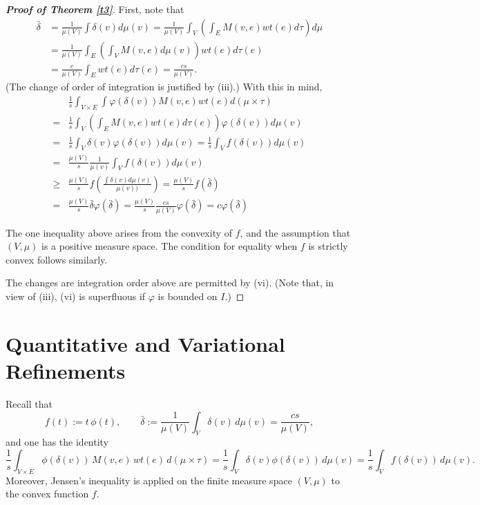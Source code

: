 \documentclass[final,1p,times]{elsarticle}
\begin{document}
\begin{proof}[\textbf{Proof of Theorem \ref{t3}}]
    
First, note that 
\begin{eqnarray*}
\bar {\delta} & = \frac {1}{\mu (V)} \int \delta (v) d \mu (v) = \frac {1}{\mu (V)} \int _V (\int _E M(v, e) wt(e) d \tau) d \mu\\
& = \frac {1}{\mu (V)} \int _E (\int _V M(v, e) d \mu(v)) wt(e) d \tau (e)\\
& = \frac {c}{\mu (V)} \int _E wt (e) d \tau (e) = \frac {cs}{\mu (V)}.
\end{eqnarray*}
(The change of order of integration is justified by (iii).)
With this in mind,
\begin{eqnarray*}
& \frac {1}{s} \int_{V \times E} \int \varphi (\delta (v)) M(v, e) wt(e) d(\mu \times \tau)\\
= & \frac {1}{s} \int _V (\int _E M(v, e) wt(e) d \tau (e)) \varphi (\delta (v)) d \mu (v)\\
= & \frac {1}{s} \int _V \delta (v) \varphi (\delta (v)) d \mu (v) = \frac {1}{s} \int _V f(\delta (v)) d \mu (v)\\
= & \frac {\mu (V)}{s} \frac {1}{\mu (v)} \int _V f(\delta (v)) d \mu (v)\\
\geq & \frac {\mu (V)}{s} f(\frac {\int \delta (v) d \mu (v)}{\mu (v))}) = \frac {\mu (V)}{s} f (\bar {\delta})\\ 
= &  \frac {\mu (V)}{s} \bar {\delta} \varphi (\bar {\delta}) = \frac {\mu (V)}{s} \frac {cs}{\mu (V)} \varphi (\bar {\delta}) = c \varphi (\bar {\delta})
\end{eqnarray*}

The one inequality above arises from the convexity of $f$, and the assumption that $(V, \mu)$ is a positive measure space.  The condition for equality when $f$ is strictly convex follows similarly.

The changes are integration order above are permitted by (vi).  (Note that, in view of (iii), (vi) is superfluous if $\varphi$ is bounded on $I$.)
\end{proof}




\section{Quantitative and Variational Refinements}
Recall that
\[
f(t):=t\,\phi(t),\qquad 
\bar\delta:=\frac{1}{\mu(V)}\int_V \delta(v)\,d\mu(v)=\frac{cs}{\mu(V)},
\]
and one has the identity
\begin{equation}
\label{eq:key-identity}
\frac{1}{s}\int_{V\times E}\phi(\delta(v))\,M(v,e)\,wt(e)\,d(\mu\times\tau)
=
\frac{1}{s}\int_V \delta(v)\phi(\delta(v))\,d\mu(v)
=
\frac{1}{s}\int_V f(\delta(v))\,d\mu(v).
\end{equation}
Moreover, Jensen's inequality is applied on the finite measure space \((V,\mu)\) to the convex function \(f\).
\end{document}
